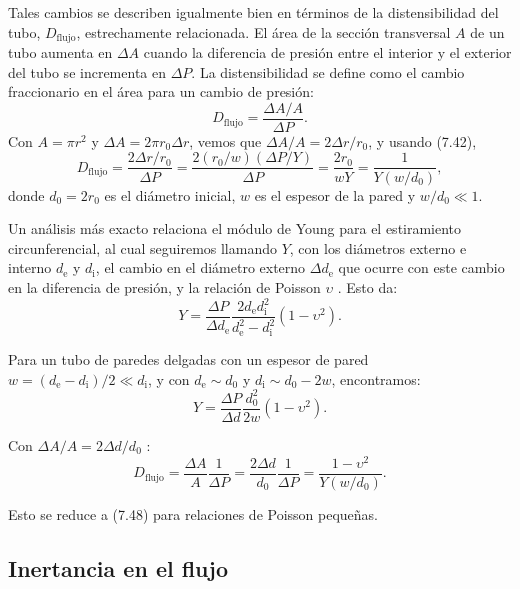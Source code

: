 \documentclass[12pt]{book}
\begin{document}
Tales cambios se describen igualmente bien en términos de la distensibilidad del tubo, $D_{\text{flujo}}$, estrechamente relacionada. El área de la sección transversal $A$ de un tubo aumenta en $\Delta A$ cuando la diferencia de presión entre el interior y el exterior del tubo se incrementa en $\Delta P$. La distensibilidad se define como el cambio fraccionario en el área para un cambio de presión:
\begin{equation}
D_{\text{flujo}} = \frac{\Delta A/A}{\Delta P}.
\label{eq:747}
\end{equation}
Con $A = \pi r^2$ y $\Delta A = 2\pi r_0 \Delta r$, vemos que $\Delta A/A = 2\Delta r/r_0$, y usando (7.42),
\begin{equation}
D_{\text{flujo}} = \frac{2\Delta r/r_0}{\Delta P} = \frac{2(r_0/w)(\Delta P/Y)}{\Delta P} = \frac{2r_0}{wY} = \frac{1}{Y(w/d_0)},
\label{eq:748}
\end{equation}
donde $d_0 = 2r_0$ es el diámetro inicial, $w$ es el espesor de la pared y $w/d_0 \ll 1$.

Un análisis más exacto relaciona el módulo de Young para el estiramiento circunferencial, al cual seguiremos llamando $Y$, con los diámetros externo e interno $d_{\text{e}}$ y $d_{\text{i}}$, el cambio en el diámetro externo $\Delta d_{\text{e}}$ que ocurre con este cambio en la diferencia de presión, y la relación de Poisson $\upsilon$ \cite{4}. Esto da:
\begin{equation}
Y = \frac{\Delta P}{\Delta d_{\text{e}}} \frac{2 d_{\text{e}} d_{\text{i}}^2}{d_{\text{e}}^2 - d_{\text{i}}^2} (1 - \upsilon^2).
\label{eq:749}
\end{equation}

Para un tubo de paredes delgadas con un espesor de pared $w = (d_{\text{e}} - d_{\text{i}})/2 \ll d_{\text{i}}$, y con $d_{\text{e}} \sim d_0$ y $d_{\text{i}} \sim d_0 - 2w$, encontramos:
\begin{equation}
Y = \frac{\Delta P}{\Delta d} \frac{d_0^2}{2w} (1 - \upsilon^2).
\label{eq:750}
\end{equation}

Con $\Delta A/A = 2\Delta d/d_0$ \cite{22}:
\begin{equation}
D_{\text{flujo}} = \frac{\Delta A}{A} \frac{1}{\Delta P} = \frac{2\Delta d}{d_0} \frac{1}{\Delta P} = \frac{1 - \upsilon^2}{Y(w/d_0)}.
\label{eq:751}
\end{equation}

Esto se reduce a (7.48) para relaciones de Poisson pequeñas.

\subsection{Inertancia en el flujo}
\end{document}
